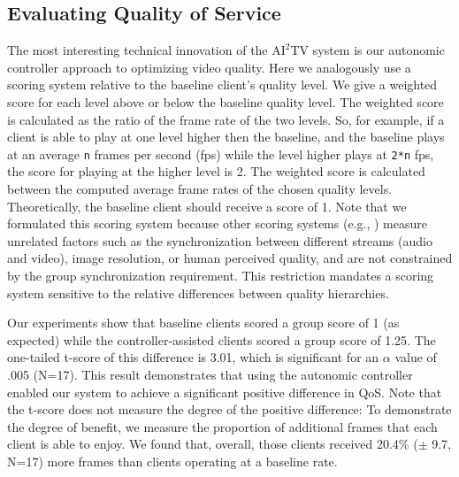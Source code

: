 \documentclass{sig-alternate}
\begin{document}



\subsection{Evaluating Quality of Service} 

The most interesting technical innovation of the $\mathrm{AI}^2$TV
system is our autonomic controller approach to optimizing video
quality.  Here we analogously use a scoring system relative to the
baseline client's quality level.  We give a weighted score for each
level above or below the baseline quality level.  The weighted score
is calculated as the ratio of the frame rate of the two levels.  So,
for example, if a client is able to play at one level higher then the
baseline, and the baseline plays at an average \texttt{n} frames per
second (fps) while the level higher plays at \texttt{2*n} fps, the
score for playing at the higher level is 2.  The weighted score is
calculated between the computed average frame rates of the chosen
quality levels.  Theoretically, the baseline client should receive a
score of 1.  Note that we formulated this scoring system because other
scoring systems (e.g., \cite{BAQAI,CORTE,CONWAY2000}) measure
unrelated factors such as the synchronization between different
streams (audio and video), image resolution, or human perceived
quality, and are not constrained by the group synchronization
requirement.  This restriction mandates a scoring system sensitive to
the relative differences between quality hierarchies.


Our experiments show that baseline clients scored a group score of 1
(as expected) while the controller-assisted clients scored a group
score of 1.25.  The one-tailed t-score of this difference is 3.01,
which is significant for an $\alpha$ value of .005 (N=17).  This
result demonstrates that using the autonomic controller enabled our
system to achieve a significant positive difference in QoS.  Note that
the t-score does not measure the degree of the positive difference: To
demonstrate the degree of benefit, we measure the proportion of
additional frames that each client is able to enjoy.  We found that,
overall, those clients received 20.4\% ($\pm$ 9.7, N=17) more frames
than clients operating at a baseline rate.
\end{document}
